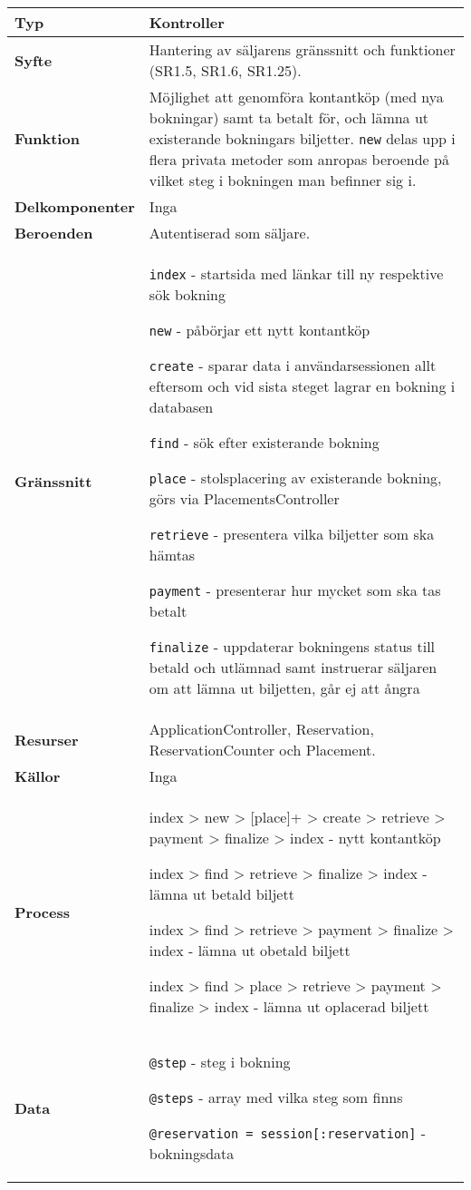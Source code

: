 \documentclass[a4paper, twoside, 11pt, titlepage]{article}
\begin{document}
			\begin {table} [ht] \begin{tabular} {  p{3.5cm} p{11.6cm} }
				\hline
				{\sffamily\textbf{Typ}} & {Kontroller} \\
				\hline
				{\sffamily\textbf{Syfte}} & {Hantering av säljarens gränssnitt och funktioner (SR1.5, SR1.6, SR1.25).} \\
				\hline
				{\sffamily\textbf{Funktion}} & {Möjlighet att genomföra kontantköp (med nya bokningar) samt ta betalt för, och lämna ut existerande bokningars biljetter. {\tt new} delas upp i flera privata metoder som anropas beroende på vilket steg i bokningen man befinner sig i.} \\
				\hline
				{\sffamily\textbf{Delkomponenter}} & {Inga} \\
				\hline
				{\sffamily\textbf{Beroenden}} & {Autentiserad som säljare.} \\
				\hline
				{\sffamily\textbf{Gränssnitt}} & {{\tt index} - startsida med länkar till ny respektive sök bokning

{\tt new} - påbörjar ett nytt kontantköp

{\tt create} - sparar data i användarsessionen allt eftersom och vid sista steget lagrar en bokning i databasen

{\tt find} - sök efter existerande bokning

{\tt place} - stolsplacering av existerande bokning, görs via PlacementsController

{\tt retrieve} - presentera vilka biljetter som ska hämtas

{\tt payment} - presenterar hur mycket som ska tas betalt

{\tt finalize} - uppdaterar bokningens status till betald och utlämnad samt instruerar säljaren om att lämna ut biljetten, går ej att ångra} \\
				\hline
				{\sffamily\textbf{Resurser}} & {ApplicationController, Reservation, ReservationCounter och Placement.} \\
				\hline
				{\sffamily\textbf{Källor}} & {Inga} \\
				\hline
				{\sffamily\textbf{Process}} & {index > new > [place]+ > create > retrieve > payment > finalize > index - nytt kontantköp

index > find > retrieve > finalize > index - lämna ut betald biljett

index > find > retrieve > payment > finalize > index - lämna ut obetald biljett

index > find > place > retrieve > payment > finalize > index - lämna ut oplacerad biljett} \\
				\hline
				{\sffamily\textbf{Data}} & {{\tt @step} - steg i bokning

{\tt @steps} - array med vilka steg som finns

{\tt @reservation = session[:reservation]} - bokningsdata} \\
				\hline
			\end{tabular} \end{table} \FloatBarrier
\end{document}
